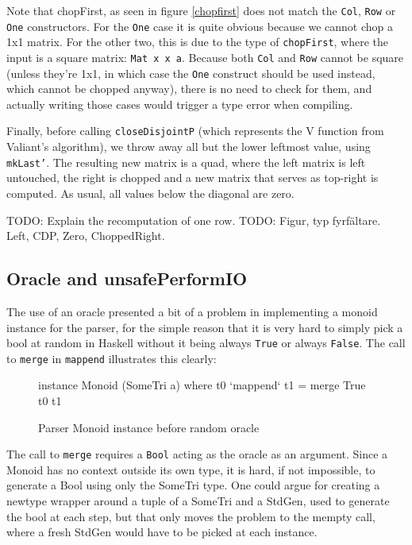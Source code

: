 \documentclass[a4paper,12pt,twosided]{report}
\begin{document}
Note that chopFirst, as seen in figure \ref{chopfirst} does not match the
\texttt{Col}, \texttt{Row} or \texttt{One} constructors. For the \texttt{One}
case it is quite obvious because we cannot chop a 1x1 matrix. For the other two,
this is due to the type of \texttt{chopFirst}, where the input is a square
matrix: \texttt{Mat x x a}. Because both \texttt{Col} and \texttt{Row} cannot be
square (unless they're 1x1, in which case the \texttt{One} construct should be
used instead, which cannot be chopped anyway), there is no need to check for
them, and actually writing those cases would trigger a type error when
compiling.

Finally, before calling \texttt{closeDisjointP} (which represents the V function
from Valiant's algorithm), we throw away all but the lower leftmost value, using
\texttt{mkLast'}. The resulting new matrix is a quad, where the left matrix is
left untouched, the right is chopped and a new matrix that serves as top-right
is computed. As usual, all values below the diagonal are zero.

TODO: Explain the recomputation of one row.
TODO: Figur, typ fyrfältare. Left, CDP, Zero, ChoppedRight.

\subsection{Oracle and unsafePerformIO}
The use of an oracle presented a bit of a problem in implementing a monoid
instance for the parser, for the simple reason that it is very hard to simply
pick a bool at random in Haskell without it being always \texttt{True} or always
\texttt{False}. The call to \texttt{merge} in \texttt{mappend} illustrates this
clearly:

\begin{figure}[H]
\begin{code}
instance Monoid (SomeTri a) where
    t0 `mappend` t1 = merge True t0 t1
\end{code}
\caption{Parser Monoid instance before random oracle}
\end{figure}

The call to \texttt{merge} requires a \texttt{Bool} acting as the oracle as an
argument. Since a Monoid has no context outside its own type, it is hard, if not
impossible, to generate a Bool using only the SomeTri type. One could argue for
creating a newtype wrapper around a tuple of a SomeTri and a StdGen, used to
generate the bool at each step, but that only moves the problem to the mempty
call, where a fresh StdGen would have to be picked at each instance.
\end{document}
